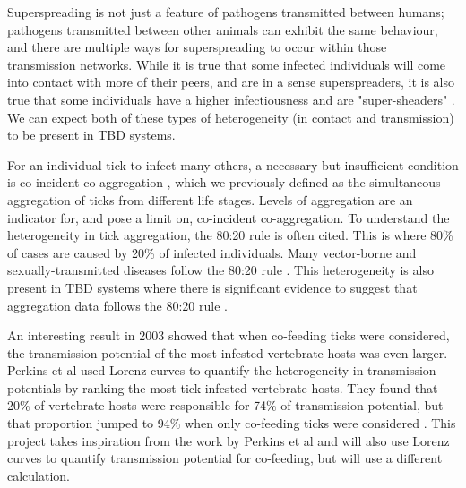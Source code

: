 \documentclass{article}
\begin{document}
Superspreading is not just a feature of pathogens transmitted between humans; pathogens transmitted between other animals can exhibit the same behaviour, and there are multiple ways for superspreading to occur within those transmission networks. While it is true that some infected individuals will come into contact with more of their peers, and are in a sense superspreaders, it is also true that some individuals have a higher infectiousness and are "super-sheaders" \cite{VanderWaal_2016}. We can expect both of these types of heterogeneity (in contact and transmission) to be present in TBD systems.

For an individual tick to infect many others, a necessary but insufficient condition is co-incident co-aggregation \cite{Ferreri2014}, which we previously defined as the simultaneous aggregation of ticks from different life stages. Levels of aggregation are an indicator for, and pose a limit on, co-incident co-aggregation. To understand the heterogeneity in tick aggregation, the 80:20 rule is often cited. This is where 80\% of cases are caused by 20\% of infected individuals. Many vector-borne and sexually-transmitted diseases follow the 80:20 rule \cite{Woolhouse1997}. This heterogeneity is also present in TBD systems where there is significant evidence to suggest that aggregation data follows the 80:20 rule \cite{Ferreri2014, Brunner2008, JohnstoneRobertson2020}.

An interesting result in 2003 showed that when co-feeding ticks were considered, the transmission potential of the most-infested vertebrate hosts was even larger. Perkins et al used Lorenz curves to quantify the heterogeneity in transmission potentials by ranking the most-tick infested vertebrate hosts. They found that 20\% of vertebrate hosts were responsible for 74\% of transmission potential, but that proportion jumped to 94\% when only co-feeding ticks were considered \cite{Perkins_2003}. This project takes inspiration from the work by Perkins et al and will also use Lorenz curves to quantify transmission potential for co-feeding, but will use a different calculation.
\end{document}
